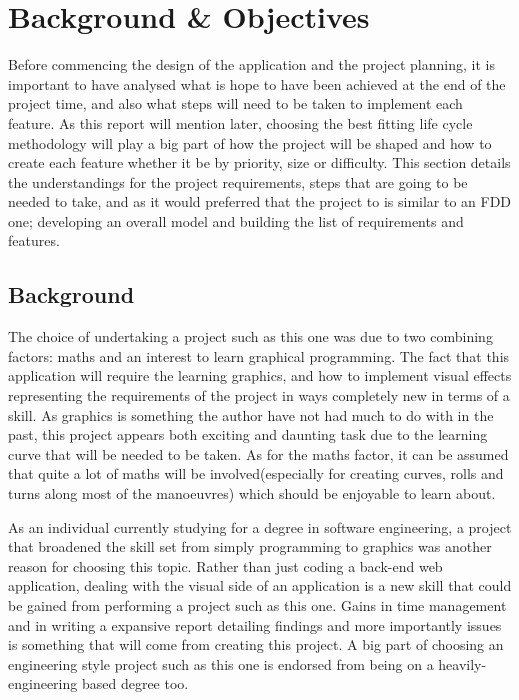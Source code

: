 \chapter{Background \& Objectives}
Before commencing the design of the application and the project planning, it is important to have analysed what is hope to have been achieved at the end of the project time, and also what steps will need to be taken to implement each feature. As this report will mention later, choosing the best fitting life cycle methodology will play a big part of how the project will be shaped and how to create each feature whether it be by priority, size or difficulty. This section details the understandings for the project requirements, steps that are going to be needed to take, and as it would preferred that the project to is similar to an FDD one; developing an overall model and building the list of requirements and features.

\section{Background}
The choice of undertaking a project such as this one was due to two combining factors: maths and an interest to learn graphical programming. The fact that this application will require the learning graphics, and how to implement visual effects representing the requirements of the project in ways completely new in terms of a skill. As graphics is something the author have not had much to do with in the past, this project appears both exciting and daunting task due to the learning curve that will be needed to be taken. As for the maths factor, it can be assumed that quite a lot of maths will be involved(especially for creating curves, rolls and turns along most of the manoeuvres) which should be enjoyable to learn about.

As an individual currently studying for a degree in software engineering, a project that broadened the skill set from simply programming to graphics was another reason for choosing this topic. Rather than just coding a back-end web application, dealing with the visual side of an application is a new skill that could be gained from performing a project such as this one. Gains in time management and in writing a expansive report detailing findings and more importantly issues is something that will come from creating this project. A big part of choosing an engineering style project such as this one is endorsed from being on a heavily-engineering based degree too.

